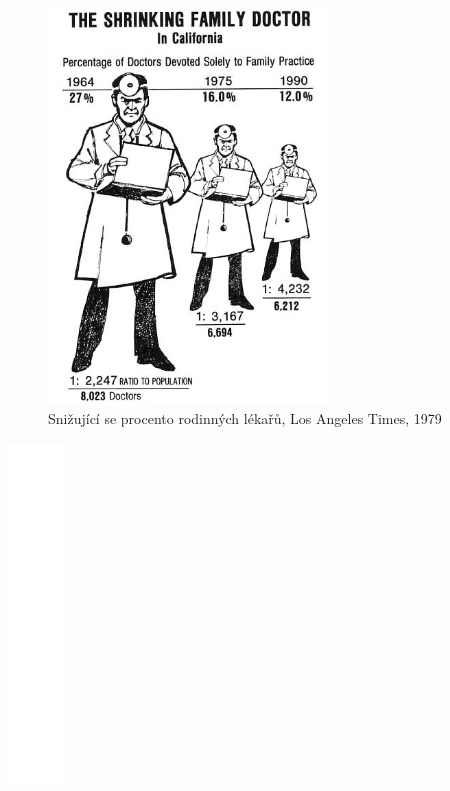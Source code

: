 \documentclass[12pt,]{article}
\begin{document}
\begin{minipage}[H]{0.475\textwidth}
 \begin{figure}[H]
\centering
    \includegraphics[height = 10.5cm]{fig/tufte_shrinking_doctor}
    \caption{Snižující se procento rodinných lékařů, Los Angeles Times, 1979}
    \label{fig:ch1.5}
 \end{figure}
\end{minipage}\begin{minipage}[H]{0.05\textwidth}
 \includegraphics[height = 9cm]{fig/blank_v}
\end{minipage}\begin{minipage}[H]{0.475\textwidth}
 \begin{figure}[H]
\centering

\end{figure}
\end{minipage}
\end{document}
